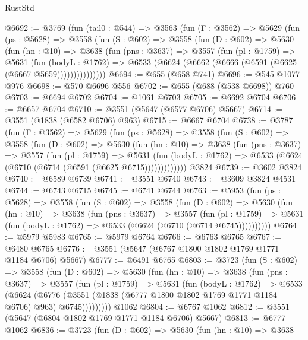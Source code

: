 \begin{lexlean}{RustStd}
\begin{coremodule}
@6692 := @3769
    (fun (tail0 : @544) =>
    @3563
      (fun (Γ : @3562) =>
      @5629
        (fun (ps : @5628) =>
        @3558
          (fun (S : @602) =>
          @3558
            (fun (D : @602) =>
            @5630
              (fun (hn : @10) =>
              @3638
                (fun (pns : @3637) =>
                @3557
                  (fun (pl : @1759) =>
                  @5631
                    (fun (bodyL : @1762) =>
                    @6533 (@6624 (@6662 (@6666 (@6591 (@6625 (@6667 @5659)))))))))))))))
@6694 := @655 (@658 @741)
@6696 := @545 @1077 @976
@6698 := @570 @6696 @556
@6702 := @655 (@688 (@538 @6698)) @760
@6703 := @6694 @6702
@6704 := @1061 @6703
@6705 := @6692 @6704
@6706 := @6657 @6704
@6710 := @3551 (@5647 (@6577 @6706) @5667)
@6714 := @3551 (@1838 (@6582 @6706) @963)
@6715 := @6667 @6704
@6738 := @3787
    (fun (Γ : @3562) =>
    @5629
      (fun (ps : @5628) =>
      @3558
        (fun (S : @602) =>
        @3558
          (fun (D : @602) =>
          @5630
            (fun (hn : @10) =>
            @3638
              (fun (pns : @3637) =>
              @3557
                (fun (pl : @1759) =>
                @5631
                  (fun (bodyL : @1762) =>
                  @6533 (@6624 (@6710 (@6714 (@6591 (@6625 @6715)))))))))))))
    @3824
@6739 := @3602 @3824
@6740 := @6589 @6739
@6741 := @3551 @6740
@6743 := @3609 @3824 @4531
@6744 := @6743 @6715
@6745 := @6741 @6744
@6763 := @5953
    (fun (ps : @5628) =>
    @3558
      (fun (S : @602) =>
      @3558
        (fun (D : @602) =>
        @5630
          (fun (hn : @10) =>
          @3638
            (fun (pns : @3637) =>
            @3557
              (fun (pl : @1759) =>
              @5631 (fun (bodyL : @1762) => @6533 (@6624 (@6710 (@6714 @6745))))))))))
@6764 := @5979 @5983
@6765 := @5979 @6764
@6766 := @6763 @6765
@6767 := @6480 @6765
@6776 := @3551 (@5647 (@6767 @1800 @1802 @1769 @1771 @1184 @6706) @5667)
@6777 := @6491 @6765
@6803 := @3723
    (fun (S : @602) =>
    @3558
      (fun (D : @602) =>
      @5630
        (fun (hn : @10) =>
        @3638
          (fun (pns : @3637) =>
          @3557
            (fun (pl : @1759) =>
            @5631
              (fun (bodyL : @1762) =>
              @6533
                (@6624
                  (@6776
                    (@3551 (@1838 (@6777 @1800 @1802 @1769 @1771 @1184 @6706) @963) @6745)))))))))
    @1062
@6804 := @6767 @1062
@6812 := @3551 (@5647 (@6804 @1802 @1769 @1771 @1184 @6706) @5667)
@6813 := @6777 @1062
@6836 := @3723
    (fun (D : @602) =>
    @5630
      (fun (hn : @10) =>
      @3638

\end{coremodule}
\end{lexlean}
